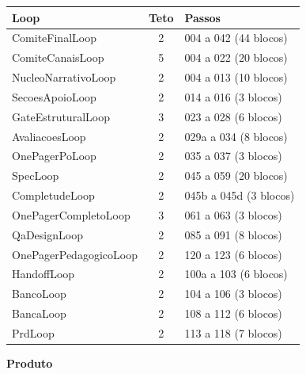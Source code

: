 \documentclass[10pt,a4paper]{article}
\newcommand{\cod}[1]{{\ttfamily\footnotesize #1}}
\begin{document}
{\footnotesize\begin{tabularx}{\textwidth}{l c X}\toprule Loop & Teto & Passos \\ \midrule
\cod{ComiteFinalLoop} & 2 & 004 a 042 (44 blocos) \\
\cod{ComiteCanaisLoop} & 5 & 004 a 022 (20 blocos) \\
\cod{NucleoNarrativoLoop} & 2 & 004 a 013 (10 blocos) \\
\cod{SecoesApoioLoop} & 2 & 014 a 016 (3 blocos) \\
\cod{GateEstruturalLoop} & 3 & 023 a 028 (6 blocos) \\
\cod{AvaliacoesLoop} & 2 & 029a a 034 (8 blocos) \\
\cod{OnePagerPoLoop} & 2 & 035 a 037 (3 blocos) \\
\cod{SpecLoop} & 2 & 045 a 059 (20 blocos) \\
\cod{CompletudeLoop} & 2 & 045b a 045d (3 blocos) \\
\cod{OnePagerCompletoLoop} & 3 & 061 a 063 (3 blocos) \\
\cod{QaDesignLoop} & 2 & 085 a 091 (8 blocos) \\
\cod{OnePagerPedagogicoLoop} & 2 & 120 a 123 (6 blocos) \\
\cod{HandoffLoop} & 2 & 100a a 103 (6 blocos) \\
\cod{BancoLoop} & 2 & 104 a 106 (3 blocos) \\
\cod{BancaLoop} & 2 & 108 a 112 (6 blocos) \\
\cod{PrdLoop} & 2 & 113 a 118 (7 blocos) \\
\bottomrule\end{tabularx}}
\newpage
{}
{\sffamily\bfseries\Large\color{unNavy}Produto}\\[0.3em]
\end{document}
